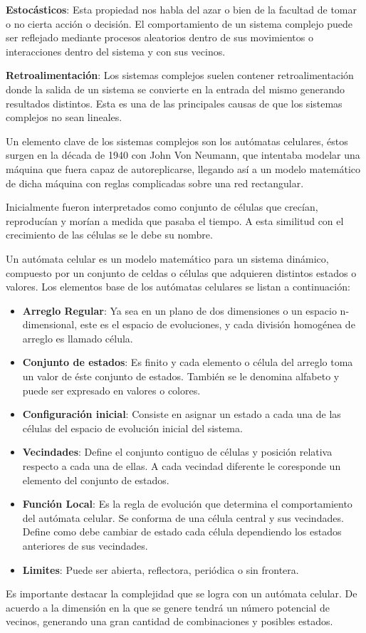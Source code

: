       \textbf{Estocásticos}: Esta propiedad nos habla del azar o bien de la facultad de tomar o no cierta acción o decisión. El comportamiento de un sistema complejo puede ser reflejado mediante procesos aleatorios dentro de sus movimientos o interacciones dentro del sistema y con sus vecinos.

      \textbf{Retroalimentación}: Los sistemas complejos suelen contener retroalimentación donde la salida de un sistema se convierte en la entrada del mismo generando resultados distintos. Esta es una de las principales causas de que los sistemas complejos no sean lineales.\cite{3} \cite{5}

      Un elemento clave de los sistemas complejos son los autómatas celulares, éstos surgen en la década de 1940 con John Von Neumann, que intentaba modelar una máquina que fuera capaz de autoreplicarse, llegando así a un modelo matemático de dicha máquina con reglas complicadas sobre una red rectangular.

      Inicialmente fueron interpretados como conjunto de células que crecían, reproducían y morían a medida que pasaba el tiempo. A esta similitud con el crecimiento de las células se le debe su nombre.

      Un autómata celular es un modelo matemático para un sistema dinámico, compuesto por un conjunto de celdas o células que adquieren distintos estados o valores. Los elementos base de los autómatas celulares se listan a continuación:
      \begin{itemize}
        \item{\textbf{Arreglo Regular}: Ya sea en un plano de dos dimensiones o un espacio n-dimensional, este es el espacio de evoluciones, y cada división homogénea de arreglo es llamado célula.}
        \item{\textbf{Conjunto de estados}: Es finito y cada elemento o célula del arreglo toma un valor de éste conjunto de estados. También se le denomina alfabeto y puede ser expresado en valores o colores.}
        \item{\textbf{Configuración inicial}: Consiste en asignar un estado a cada una de las células del espacio de evolución inicial del sistema.}
        \item{\textbf{Vecindades}: Define el conjunto contiguo de células y posición relativa respecto a cada una de ellas. A cada vecindad diferente le coresponde un elemento del conjunto de estados.}
        \item{\textbf{Función Local}: Es la regla de evolución que determina el comportamiento del autómata celular. Se conforma de una célula central y sus vecindades. Define como debe cambiar de estado cada célula dependiendo los estados anteriores de sus vecindades.}
        \item{\textbf{Limites}: Puede ser abierta, reflectora, periódica o sin frontera.}
      \end{itemize}
    Es importante destacar la complejidad que se logra con un autómata celular. De acuerdo a la dimensión en la que se genere tendrá un número potencial de vecinos, generando una gran cantidad de combinaciones y posibles estados.

